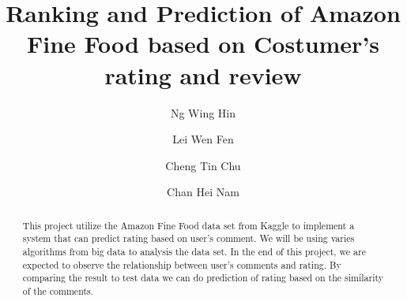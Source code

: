 \documentclass[sigconf]{acmart}
\begin{document}
\title{Ranking and Prediction of Amazon Fine Food based on Costumer's rating and review}

\author{Ng Wing Hin}

\author{Lei Wen Fen}

\author{Cheng Tin Chu}

\author{Chan Hei Nam}

\graphicspath{ {images/} }

\begin{abstract}
This project utilize the Amazon Fine Food data set from Kaggle to implement a system that can predict rating based on user's comment. We will be using varies algorithms from big data to analysis the data set. In the end of this project, we are expected to observe the relationship between user's comments and rating. By comparing the result to test data we can do prediction of rating based on the similarity of the comments.
\end{abstract}
\maketitle



%
% 
\end{document}
